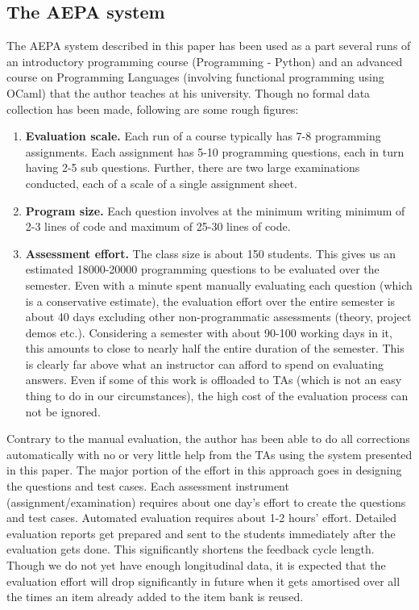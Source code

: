 \documentclass[sigconf]{acmart}
\begin{document}
\subsection{The AEPA system}
The AEPA system described in this paper has been used as a part several runs of an introductory programming course (Programming - Python) and an advanced course on Programming Languages (involving functional programming using OCaml) that the author teaches at his university. Though no formal data collection has been made, following are some rough figures:
\begin{enumerate}
\item \textbf{Evaluation scale.} Each run of a course typically has 7-8 programming assignments. Each assignment has 5-10 programming questions, each in turn having 2-5 sub questions. Further, there are two large examinations conducted, each of a scale of a single assignment sheet.
\item \textbf{Program size.} Each question involves at the minimum writing minimum of 2-3 lines of code and maximum of 25-30 lines of code.
\item \textbf{Assessment effort.} The class size is about 150 students. This gives us an estimated 18000-20000 programming questions to be evaluated over the semester. Even with a minute spent manually evaluating each question (which is a conservative estimate), the evaluation effort over the entire semester is about 40 days excluding other non-programmatic assessments (theory, project demos etc.). Considering a semester with about 90-100 working days in it, this amounts to close to nearly half the entire duration of the semester. This is clearly far above what an instructor can afford to spend on evaluating answers. Even if some of this work is offloaded to TAs (which is not an easy thing to do in our circumstances), the high cost of the evaluation process can not be ignored.
\end{enumerate}

Contrary to the manual evaluation, the author has been able to do all corrections automatically with no or very little help from the TAs using the system presented in this paper. The major portion of the effort in this approach goes in designing the questions and test cases. Each assessment instrument (assignment/examination) requires about one day's effort to create the questions and test cases. Automated evaluation requires about 1-2 hours' effort. Detailed evaluation reports get prepared and sent to the students immediately after the evaluation gets done. This significantly shortens the feedback cycle length. Though we do not yet have enough longitudinal data, it is expected that the evaluation effort will drop significantly in future when it gets amortised over all the times an item already added to the item bank is reused.
\end{document}
